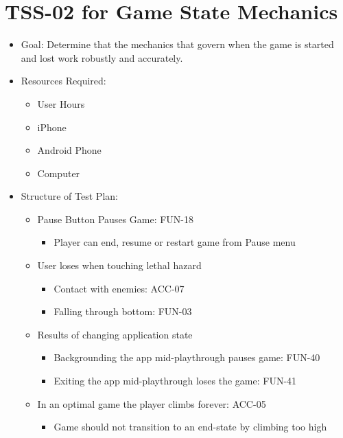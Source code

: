 \section{TSS-02 for Game State Mechanics }
\begin{itemize}
\item Goal: Determine that the mechanics that govern when the game is started
and lost work robustly and accurately.
\item Resources Required: 

\begin{itemize}
\item User Hours 
\item iPhone 
\item Android Phone 
\item Computer 
\end{itemize}
\item Structure of Test Plan: 

\begin{itemize}
\item Pause Button Pauses Game: FUN-18 

\begin{itemize}
\item Player can end, resume or restart game from Pause menu 
\end{itemize}
\item User loses when touching lethal hazard 

\begin{itemize}
\item Contact with enemies: ACC-07 
\item Falling through bottom: FUN-03 
\end{itemize}
\item Results of changing application state 

\begin{itemize}
\item Backgrounding the app mid-playthrough pauses game: FUN-40 
\item Exiting the app mid-playthrough loses the game: FUN-41 
\end{itemize}
\item In an optimal game the player climbs forever: ACC-05 

\begin{itemize}
\item Game should not transition to an end-state by climbing too high
\end{itemize}
\end{itemize}
\end{itemize}

